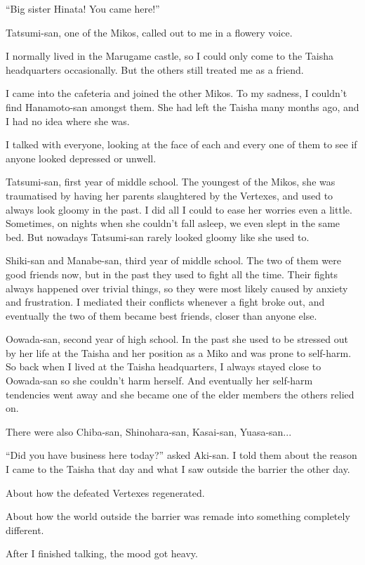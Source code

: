 ``Big sister Hinata! You came here!''

Tatsumi-san, one of the Mikos, called out to me in a flowery voice.

I normally lived in the Marugame castle, so I could only come to the Taisha headquarters occasionally. But the others still treated me as a friend.

I came into the cafeteria and joined the other Mikos. To my sadness, I couldn't find Hanamoto-san amongst them. She had left the Taisha many months ago, and I had no idea where she was.

I talked with everyone, looking at the face of each and every one of them to see if anyone looked depressed or unwell.

Tatsumi-san, first year of middle school. The youngest of the Mikos, she was traumatised by having her parents slaughtered by the Vertexes, and used to always look gloomy in the past. I did all I could to ease her worries even a little. Sometimes, on nights when she couldn't fall asleep, we even slept in the same bed. But nowadays Tatsumi-san rarely looked gloomy like she used to.

Shiki-san and Manabe-san, third year of middle school. The two of them were good friends now, but in the past they used to fight all the time. Their fights always happened over trivial things, so they were most likely caused by anxiety and frustration. I mediated their conflicts whenever a fight broke out, and eventually the two of them became best friends, closer than anyone else.

Oowada-san, second year of high school. In the past she used to be stressed out by her life at the Taisha and her position as a Miko and was prone to self-harm. So back when I lived at the Taisha headquarters, I always stayed close to Oowada-san so she couldn't harm herself. And eventually her self-harm tendencies went away and she became one of the elder members the others relied on.

There were also Chiba-san, Shinohara-san, Kasai-san, Yuasa-san...

``Did you have business here today?'' asked Aki-san. I told them about the reason I came to the Taisha that day and what I saw outside the barrier the other day.

About how the defeated Vertexes regenerated.

About how the world outside the barrier was remade into something completely different.

After I finished talking, the mood got heavy.

